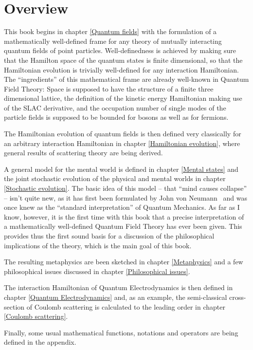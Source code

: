 \documentclass[10pt,a4paper,twoside,openany]{book}
\begin{document}
\section*{Overview}

This book begins in chapter \ref{Quantum fields} with the formulation of a mathematically well-defined frame for any theory of mutually interacting quantum fields of point particles. Well-definedness is achieved by making sure that the Hamilton space of the quantum states is finite dimensional, so that the Hamiltonian evolution is trivially well-defined for any interaction Hamiltonian. The ``ingredients'' of this mathematical frame are already well-known in Quantum Field Theory: Space is supposed to have the structure of a finite three dimensional lattice, the definition of the kinetic energy Hamiltonian making use of the SLAC derivative, and the occupation number of single modes of the particle fields is supposed to be bounded for bosons as well as for fermions.

The Hamiltonian evolution of quantum fields is then defined very classically for an arbitrary interaction Hamiltonian in chapter \ref{Hamiltonian evolution}, where general results of scattering theory are being derived.

A general model for the mental world is defined in chapter \ref{Mental states} and the joint stochastic evolution of the physical and mental worlds in chapter \ref{Stochastic evolution}. The basic idea of this model -- that ``mind causes collapse'' -- isn't quite new, as it has first been formulated by John von Neumann~\cite{Neumann1932} and was once knew as the ``standard interpretation'' of Quantum Mechanics. As far as I know, however, it is the first time with this book that a precise interpretation of a mathematically well-defined Quantum Field Theory has ever been given. This provides thus the first sound basis for a discussion of the philosophical implications of the theory, which is the main goal of this book.

The resulting metaphysics are been sketched in chapter \ref{Metaphysics} and a few philosophical issues discussed in chapter \ref{Philosophical issues}.

The interaction Hamiltonian of Quantum  Electrodynamics is then defined in chapter \ref{Quantum Electrodynamics} and, as an example, the semi-classical cross-section of Coulomb scattering is calculated to the leading order in chapter \ref{Coulomb scattering}.

Finally, some usual mathematical functions, notations and operators are being defined in the appendix.
\end{document}
